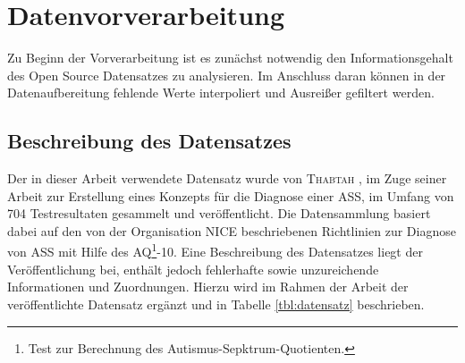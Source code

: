 \section{Datenvorverarbeitung}
Zu Beginn der Vorverarbeitung ist es zunächst notwendig den Informationsgehalt des Open Source Datensatzes zu analysieren. Im Anschluss daran können in der Datenaufbereitung fehlende Werte interpoliert und Ausreißer gefiltert werden.

\subsection{Beschreibung des Datensatzes}
Der in dieser Arbeit verwendete Datensatz wurde von \textsc{Thabtah} \cite{Thabtah2017, Thabtah}, im Zuge seiner Arbeit zur Erstellung eines Konzepts für die Diagnose einer ASS, im Umfang von 704 Testresultaten gesammelt und veröffentlicht. Die Datensammlung basiert dabei auf den von der Organisation \textsc{NICE} \cite{NICE2012} beschriebenen Richtlinien zur Diagnose von ASS mit Hilfe des AQ\footnote{\label{foot:3}Test zur Berechnung des Autismus-Sepktrum-Quotienten.}-10. Eine Beschreibung des Datensatzes liegt der Veröffentlichung bei, enthält jedoch fehlerhafte sowie unzureichende Informationen und Zuordnungen. Hierzu wird im Rahmen der Arbeit der veröffentlichte Datensatz ergänzt und in Tabelle \ref{tbl:datensatz} beschrieben.

